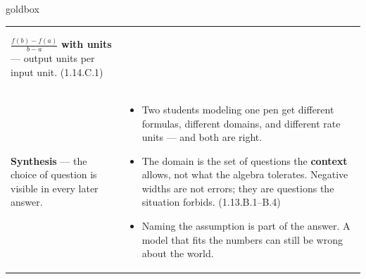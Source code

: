 \documentclass[10pt]{article}
\begin{document}
\begin{skillbox}{goldbox}
\begin{tabularx}{\linewidth}{@{}X X@{}}
\begin{itemize}[leftmargin=1.2em,itemsep=2pt,topsep=0pt]
        $\frac{f(b)-f(a)}{b-a}$ \textbf{with units} --- output units per input
        unit. (1.14.C.1)
\end{itemize} \\
\textbf{Synthesis} --- the choice of question is visible in every later answer. &
\begin{itemize}[leftmargin=1.2em,itemsep=2pt,topsep=0pt]
  \item Two students modeling one pen get different formulas, different
        domains, and different rate units --- and both are right.
  \item The domain is the set of questions the \textbf{context} allows, not
        what the algebra tolerates. Negative widths are not errors; they are
        questions the situation forbids. (1.13.B.1--B.4)
  \item Naming the assumption is part of the answer. A model that fits the
        numbers can still be wrong about the world.
\end{itemize} \\
\end{tabularx}
\end{skillbox}
\end{document}
